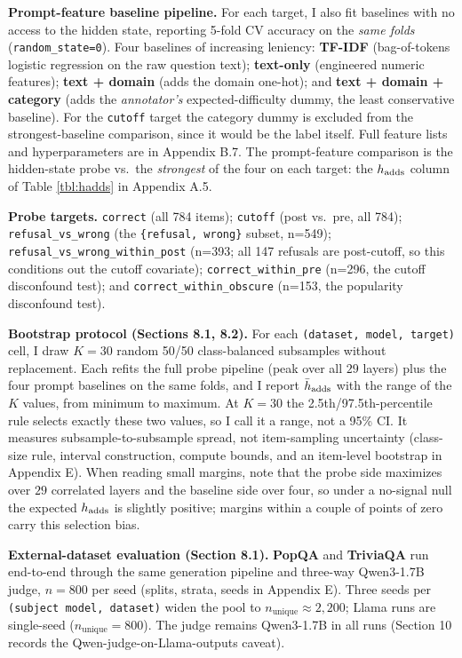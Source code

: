 \textbf{Prompt-feature baseline pipeline.} For each target, I also fit
baselines with no access to the hidden state, reporting 5-fold CV
accuracy on the \emph{same folds} (\texttt{random\_state=0}). Four
baselines of increasing leniency: \textbf{TF-IDF} (bag-of-tokens
logistic regression on the raw question text); \textbf{text-only}
(engineered numeric features); \textbf{text + domain} (adds the domain
one-hot); and \textbf{text + domain + category} (adds the
\emph{annotator's} expected-difficulty dummy, the least conservative
baseline). For the \texttt{cutoff} target the category dummy is excluded
from the strongest-baseline comparison, since it would be the label
itself. Full feature lists and hyperparameters are in Appendix B.7. The
prompt-feature comparison is the hidden-state probe vs.~the \emph{strongest} of
the four on each target: the \(h_{\rm adds}\) column of Table \ref{tbl:hadds} in Appendix A.5.

\textbf{Probe targets.} \texttt{correct} (all 784 items);
\texttt{cutoff} (post vs.~pre, all 784); \texttt{refusal\_vs\_wrong}
(the \texttt{\{refusal,\ wrong\}} subset, n=549);
\texttt{refusal\_vs\_wrong\_within\_post} (n=393; all 147 refusals are
post-cutoff, so this conditions out the cutoff covariate);
\texttt{correct\_within\_pre} (n=296, the cutoff disconfound test); and
\texttt{correct\_within\_obscure} (n=153, the popularity disconfound
test).

\textbf{Bootstrap protocol (Sections 8.1, 8.2).} For each
\texttt{(dataset,\ model,\ target)} cell, I draw \(K = 30\) random 50/50
class-balanced subsamples without replacement. Each refits the full
probe pipeline (peak over all \(29\) layers) plus the four prompt
baselines on the same folds, and I report \(\bar h_{\rm adds}\) with the range of the \(K\) values, from minimum
to maximum. At \(K = 30\) the 2.5th/97.5th-percentile rule selects exactly these two values, so I call it a range, not a
95\% CI. It measures subsample-to-subsample spread, not item-sampling uncertainty (class-size rule, interval construction, compute bounds, and an item-level bootstrap in Appendix E). When reading small margins, note that the probe side maximizes over \(29\) correlated layers and the baseline side over four, so under a no-signal null the expected \(h_{\rm adds}\) is slightly positive; margins within a couple of points of
zero carry this selection bias.

\textbf{External-dataset evaluation (Section 8.1).} \textbf{PopQA}
\citep{mallen2023popqa} and \textbf{TriviaQA} \citep{joshi2017triviaqa} run
end-to-end through the same generation pipeline and three-way
Qwen3-1.7B judge, \(n=800\) per seed (splits, strata, seeds in Appendix
E). Three seeds per \texttt{(subject\ model,\ dataset)} widen the pool
to \(n_{\text{unique}} \approx 2{,}200\); Llama runs are single-seed
(\(n_{\text{unique}} = 800\)). The judge remains Qwen3-1.7B in all runs
(Section 10 records the Qwen-judge-on-Llama-outputs caveat).
